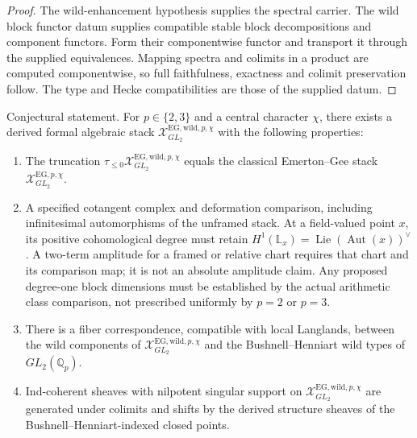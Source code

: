 \begin{proof}
The wild-enhancement hypothesis supplies the spectral carrier.
The wild block functor datum supplies compatible stable block
decompositions and component functors. Form their componentwise
functor and transport it through the supplied equivalences.
Mapping spectra and colimits in a product are computed componentwise,
so full faithfulness, exactness and colimit preservation follow.
The type and Hecke compatibilities are those of the supplied datum.
\end{proof}

\begin{conjecture}
\label{v4-arith:deg-f1a:conj:EG-wild-enhancement}
Conjectural statement. For \(p\in\{2,3\}\) and a central character
\(\chi\), there exists a derived formal algebraic stack
\(\mathcal{X}^{\mathrm{EG,wild},p,\chi}_{GL_{2}}\) with the following
properties:
\begin{enumerate}
\item The truncation
\(\tau_{\leq 0}\mathcal{X}^{\mathrm{EG,wild},p,\chi}_{GL_{2}}\) equals
the classical Emerton--Gee stack
\(\mathcal{X}^{\mathrm{EG},p,\chi}_{GL_{2}}\).
\item A specified cotangent complex and deformation comparison,
including infinitesimal automorphisms of the unframed stack.
At a field-valued point \(x\), its positive cohomological degree
must retain
\(H^1(\mathbb L_x)=\operatorname{Lie}(\operatorname{Aut}(x))^\vee\).
A two-term amplitude for a framed or relative chart requires that
chart and its comparison map; it is not an absolute amplitude claim.
Any proposed degree-one block dimensions must be established by the
actual arithmetic class comparison, not prescribed uniformly by
\(p=2\) or \(p=3\).
\item There is a fiber correspondence, compatible with local
Langlands, between the wild components of
\(\mathcal{X}^{\mathrm{EG,wild},p,\chi}_{GL_{2}}\) and the
Bushnell--Henniart wild types of \(GL_{2}(\mathbb{Q}_{p})\).
\item Ind-coherent sheaves with nilpotent singular support on
\(\mathcal{X}^{\mathrm{EG,wild},p,\chi}_{GL_{2}}\) are generated under
colimits and shifts by the derived structure sheaves of the
Bushnell--Henniart-indexed closed points.
\end{enumerate}
\end{conjecture}

